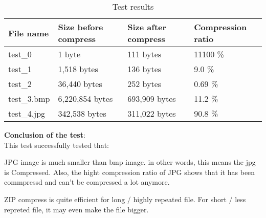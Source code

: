 \documentclass{article}
\begin{document}

	\begin{table}[]
    \caption{Test results}
		\begin{tabular}{|l|l|l|l|}
		\hline
		File name   & Size before compress & Size after compress & Compression ratio \\ \hline
		test\_0     & 1 byte               & 111 bytes           & 11100 \%          \\ \hline
		test\_1     & 1,518 bytes          & 136 bytes           & 9.0 \%            \\ \hline
		test\_2     & 36,440 bytes         & 252 bytes           & 0.69 \%           \\ \hline
		test\_3.bmp & 6,220,854 bytes      & 693,909 bytes       & 11.2 \%           \\ \hline
		test\_4.jpg & 342,538 bytes        & 311,022 bytes       & 90.8 \%           \\ \hline
		\end{tabular}
	\end{table}

	\textbf{Conclusion of the test}: \\
	This test successfully tested that: \\
	
	\item JPG image is much smaller than bmp image. in other words, this means the jpg is Compressed. Also, the hight compression ratio of JPG shows that it has been commpressd and can't be compressed a lot anymore.\\
	\item ZIP compress is quite efficient for long / highly repeated file. For short / less repreted file, it may even make the file bigger.

\newpage
\end{document}
